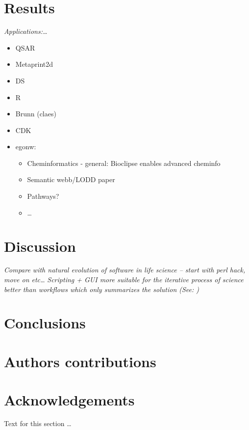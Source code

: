 \documentclass[10pt]{bmc_article}
\newenvironment{bmcformat}{\begin{raggedright}\baselineskip20pt\sloppy\setboolean{publ}{false}}{\end{raggedright}\baselineskip20pt\sloppy}
\begin{document}
\begin{bmcformat}
\section*{Results}

{\itshape
Applications:\ldots
\begin{itemize}
    \item QSAR
    \item Metaprint2d
    \item DS
    \item R
    \item Brunn (claes)
    \item CDK
    \item egonw:
    \begin{itemize}
        \item Cheminformatics - general: Bioclipse enables advanced cheminfo
        \item Semantic webb/LODD paper
        \item Pathways?
        \item \ldots
    \end{itemize}
\end{itemize}
}

\section*{Discussion}
\textit{Compare with natural evolution of software in life science --
start with perl hack, move on etc\ldots}
\pb
\textit{Scripting + GUI more suitable for the
iterative process of science better than workflows which only
summarizes the solution (See: \cite{Spinellis:2005fk})}

\section*{Conclusions}
  
    
\section*{Authors contributions}

\section*{Acknowledgements}
  Text for this section \ldots


\end{bmcformat}
\end{document}
